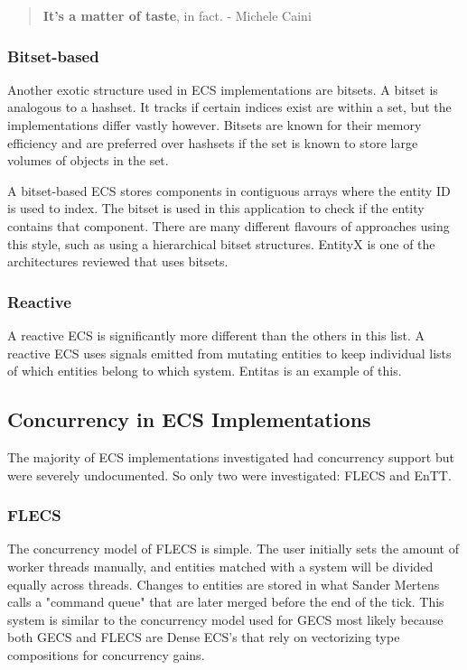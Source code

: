 \begin{quote}
    \textbf{It’s a matter of taste}, in fact.
        - Michele Caini
\end{quote}

\subsubsection{Bitset-based}
Another exotic structure used in ECS implementations are bitsets. A bitset is analogous to a hashset. It tracks if certain indices exist are within a set, but the implementations differ vastly however. Bitsets are known for their memory efficiency and are preferred over hashsets if the set is known to store large volumes of objects in the set. \cite{Sutherland2014}

A bitset-based ECS stores components in contiguous arrays where the entity ID is used to index. The bitset is used in this application to check if the entity contains that component. There are many different flavours of approaches using this style, such as using a hierarchical bitset structures. \cite{SanderMertensFAQ} EntityX is one of the architectures reviewed that uses bitsets.

\subsubsection{Reactive}
A reactive ECS is significantly more different than the others in this list. A reactive ECS uses signals emitted from mutating entities to keep individual lists of which entities belong to which system. Entitas is an example of this. \cite{SanderMertensECS}

\subsection{Concurrency in ECS Implementations}
The majority of ECS implementations investigated had concurrency support but were severely undocumented. So only two were investigated: FLECS and EnTT.

\subsubsection{FLECS}
The concurrency model of FLECS is simple. The user initially sets the amount of worker threads manually, and entities matched with a system will be divided equally across threads. Changes to entities are stored in what Sander Mertens calls a "command queue" that are later merged before the end of the tick.\cite{missing_docs} This system is similar to the concurrency model used for GECS most likely because both GECS and FLECS are Dense ECS's that rely on vectorizing type compositions for concurrency gains.

